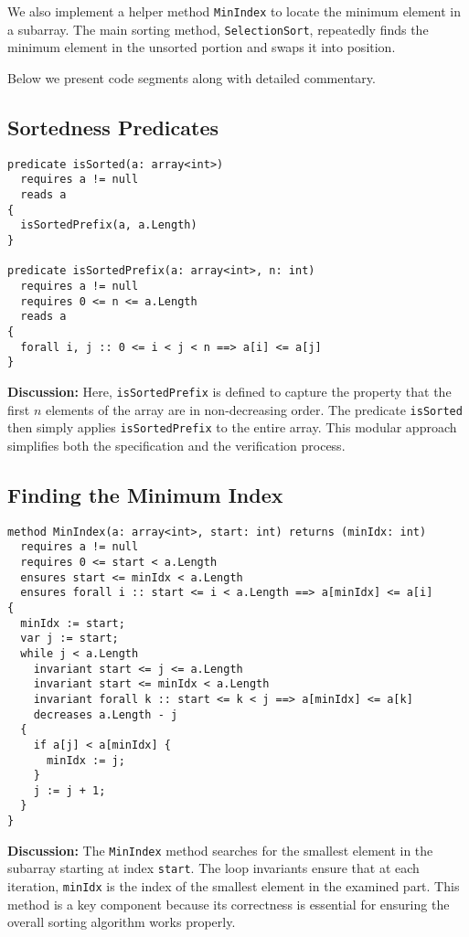 \documentclass[11pt]{article}
\begin{document}
We also implement a helper method \texttt{MinIndex} to locate the minimum element in a subarray. The main sorting method, \texttt{SelectionSort}, repeatedly finds the minimum element in the unsorted portion and swaps it into position.

Below we present code segments along with detailed commentary.

\subsection{Sortedness Predicates}
\begin{lstlisting}[caption={Sortedness Predicates}, label={lst:sortedness}]
predicate isSorted(a: array<int>)
  requires a != null
  reads a
{
  isSortedPrefix(a, a.Length)
}

predicate isSortedPrefix(a: array<int>, n: int)
  requires a != null
  requires 0 <= n <= a.Length
  reads a
{
  forall i, j :: 0 <= i < j < n ==> a[i] <= a[j]
}
\end{lstlisting}

\textbf{Discussion:}  
Here, \texttt{isSortedPrefix} is defined to capture the property that the first \( n \) elements of the array are in non-decreasing order. The predicate \texttt{isSorted} then simply applies \texttt{isSortedPrefix} to the entire array. This modular approach simplifies both the specification and the verification process.

\subsection{Finding the Minimum Index}
\begin{lstlisting}[caption={MinIndex Method}, label={lst:minindex}]
method MinIndex(a: array<int>, start: int) returns (minIdx: int)
  requires a != null
  requires 0 <= start < a.Length
  ensures start <= minIdx < a.Length
  ensures forall i :: start <= i < a.Length ==> a[minIdx] <= a[i]
{
  minIdx := start;
  var j := start;
  while j < a.Length
    invariant start <= j <= a.Length
    invariant start <= minIdx < a.Length
    invariant forall k :: start <= k < j ==> a[minIdx] <= a[k]
    decreases a.Length - j
  {
    if a[j] < a[minIdx] {
      minIdx := j;
    }
    j := j + 1;
  }
}
\end{lstlisting}

\textbf{Discussion:}  
The \texttt{MinIndex} method searches for the smallest element in the subarray starting at index \texttt{start}. The loop invariants ensure that at each iteration, \texttt{minIdx} is the index of the smallest element in the examined part. This method is a key component because its correctness is essential for ensuring the overall sorting algorithm works properly.
\end{document}
